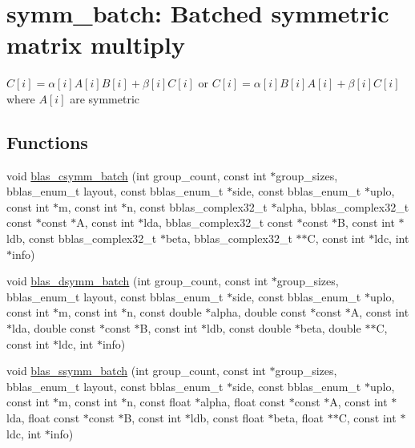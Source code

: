 \hypertarget{group__symm__batch}{}\section{symm\+\_\+batch\+: Batched symmetric matrix multiply}
\label{group__symm__batch}


$ C[i] = \alpha[i] A[i] B[i] + \beta[i] C[i] $ or $ C[i] = \alpha[i] B[i] A[i] + \beta[i] C[i] $ where $ A[i] $ are symmetric  


\subsection*{Functions}
\begin{DoxyCompactItemize}
\item 
void \hyperlink{group__symm__batch_ga6027013e9d6c2fe5dfb68cf1436faf82}{blas\+\_\+csymm\+\_\+batch} (int group\+\_\+count, const int $\ast$group\+\_\+sizes, bblas\+\_\+enum\+\_\+t layout, const bblas\+\_\+enum\+\_\+t $\ast$side, const bblas\+\_\+enum\+\_\+t $\ast$uplo, const int $\ast$m, const int $\ast$n, const bblas\+\_\+complex32\+\_\+t $\ast$alpha, bblas\+\_\+complex32\+\_\+t const $\ast$const $\ast$A, const int $\ast$lda, bblas\+\_\+complex32\+\_\+t const $\ast$const $\ast$B, const int $\ast$ldb, const bblas\+\_\+complex32\+\_\+t $\ast$beta, bblas\+\_\+complex32\+\_\+t $\ast$$\ast$C, const int $\ast$ldc, int $\ast$info)
\item 
void \hyperlink{group__symm__batch_ga86283c1c99ac1dfc211324022d62d182}{blas\+\_\+dsymm\+\_\+batch} (int group\+\_\+count, const int $\ast$group\+\_\+sizes, bblas\+\_\+enum\+\_\+t layout, const bblas\+\_\+enum\+\_\+t $\ast$side, const bblas\+\_\+enum\+\_\+t $\ast$uplo, const int $\ast$m, const int $\ast$n, const double $\ast$alpha, double const $\ast$const $\ast$A, const int $\ast$lda, double const $\ast$const $\ast$B, const int $\ast$ldb, const double $\ast$beta, double $\ast$$\ast$C, const int $\ast$ldc, int $\ast$info)
\item 
void \hyperlink{group__symm__batch_ga3b3eaaa6290ce39fd588f05737a27524}{blas\+\_\+ssymm\+\_\+batch} (int group\+\_\+count, const int $\ast$group\+\_\+sizes, bblas\+\_\+enum\+\_\+t layout, const bblas\+\_\+enum\+\_\+t $\ast$side, const bblas\+\_\+enum\+\_\+t $\ast$uplo, const int $\ast$m, const int $\ast$n, const float $\ast$alpha, float const $\ast$const $\ast$A, const int $\ast$lda, float const $\ast$const $\ast$B, const int $\ast$ldb, const float $\ast$beta, float $\ast$$\ast$C, const int $\ast$ldc, int $\ast$info)
$$
\end{DoxyCompactItemize}
